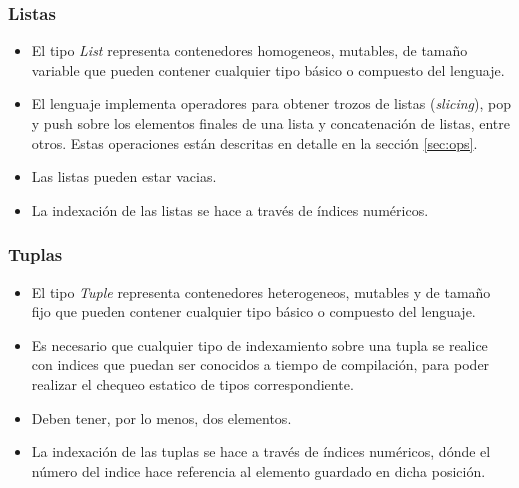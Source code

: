 \documentclass[12pt, spanish]{report}
\begin{document}
\subsubsection{Listas}
\label{sec:lists}
\begin{itemize}
\item El tipo \emph{List} representa contenedores homogeneos,
  mutables, de tama\~no variable que pueden contener cualquier tipo
  b\'asico o compuesto del lenguaje.
\item El lenguaje implementa operadores para obtener trozos de listas
  (\emph{slicing}), pop y push sobre los elementos finales de una
  lista y concatenaci\'on de listas, entre otros. Estas operaciones
  est\'an descritas en detalle en la secci\'on \ref{sec:ops}.
\item Las listas pueden estar vacias.
\item La indexaci\'on de las listas se hace a trav\'es de \'indices
  num\'ericos.
\end{itemize}

\subsubsection{Tuplas}
\label{sec:tuples}
\begin{itemize}
\item El tipo \emph{Tuple} representa contenedores heterogeneos,
  mutables y de tama\~no fijo que pueden contener cualquier tipo
  b\'asico o compuesto del lenguaje.
\item Es necesario que cualquier tipo de indexamiento sobre una tupla
  se realice con indices que puedan ser conocidos a tiempo de
  compilación, para poder realizar el chequeo estatico de tipos
  correspondiente.
\item Deben tener, por lo menos, dos elementos.
\item La indexaci\'on de las tuplas se hace a trav\'es de \'indices
  num\'ericos, dónde el número del indice hace referencia al elemento
  guardado en dicha posición.
\end{itemize}
\end{document}
